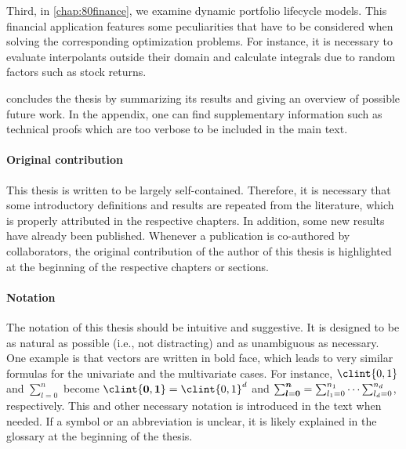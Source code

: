 Third, in \cref{chap:80finance},
we examine dynamic portfolio lifecycle models.
This financial application features some peculiarities that have
to be considered when solving the corresponding optimization problems.
For instance, it is necessary to evaluate interpolants outside their domain
and calculate integrals due to random factors such as stock returns.

 concludes the thesis by
summarizing its results and giving an overview of possible future work.
In the appendix, one can find supplementary information such as
technical proofs which are too verbose to be included in the main text.

\paragraph{Original contribution}

This thesis is written to be largely self-contained.
Therefore, it is necessary that some introductory definitions and
results are repeated from the literature,
which is properly attributed in the respective chapters.
In addition, some new results have already been published.
Whenever a publication is co-authored by collaborators,
the original contribution of the author of this thesis is highlighted
at the beginning of the respective chapters or sections.

\paragraph{Notation}

The notation of this thesis should be intuitive and suggestive.
It is designed to be as natural as possible (i.e., not distracting)
and as unambiguous as necessary.
One example is that vectors are written in bold face, which leads to
very similar formulas for the univariate and the multivariate cases.
For instance, $\clint{0, 1}$ and $\sum_{l=0}^n$
become
$\clint{\*0, \*1} = \clint{0, 1}^d$ and
$\sum_{{\boldsymbol{l}}={\boldsymbol{0}}}^{{\boldsymbol{n}}} = \sum_{l_1=0}^{n_1} \dotsb \sum_{l_d=0}^{n_d}$,
respectively.
This and other necessary notation is introduced in the text when needed.
If a symbol or an abbreviation is unclear,
it is likely explained in the glossary at the beginning of the thesis.

\cleardoublepage

